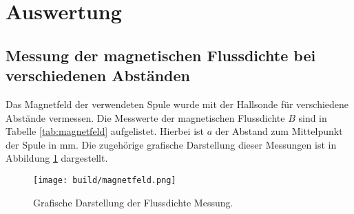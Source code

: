 \section{Auswertung}
\label{sec:Auswertung}

\subsection{Messung der magnetischen Flussdichte bei verschiedenen Abständen}
Das Magnetfeld der verwendeten Spule wurde mit der Hallsonde für verschiedene Abstände vermessen. Die Messwerte der magnetischen Flussdichte $B$ sind in Tabelle \ref{tab:magnetfeld} aufgelistet. Hierbei ist $a$ der Abstand zum Mittelpunkt der Spule in $\si{\milli\metre}$. 
Die zugehörige grafische Darstellung dieser Messungen ist in Abbildung \ref{fig:magnetfeld} dargestellt.

\begin{figure}[H]
    \centering
    \texttt{[image: build/magnetfeld.png]}
    \caption{Grafische Darstellung der Flussdichte Messung.}
    \label{fig:magnetfeld}
\end{figure}

